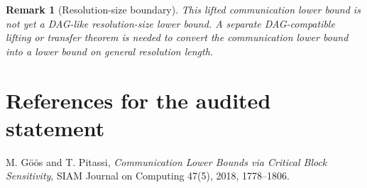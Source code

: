 \documentclass[11pt]{article}
\newtheorem{remark}{Remark}
\begin{document}
\begin{remark}[Resolution-size boundary]
This lifted communication lower bound is not yet a DAG-like resolution-size
lower bound.  A separate DAG-compatible lifting or transfer theorem is needed
to convert the communication lower bound into a lower bound on general
resolution length.
\end{remark}

\section*{References for the audited statement}

M. G\"o\"os and T. Pitassi,
\emph{Communication Lower Bounds via Critical Block Sensitivity},
SIAM Journal on Computing 47(5), 2018, 1778--1806.
\end{document}
